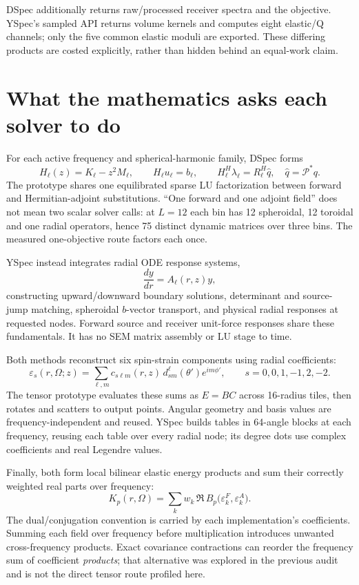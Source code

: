 DSpec additionally returns raw/processed receiver spectra and the objective. YSpec's sampled API returns volume kernels and computes eight elastic/Q channels; only the five common elastic moduli are exported. These differing products are costed explicitly, rather than hidden behind an equal-work claim.

\clearpage\section{What the mathematics asks each solver to do}
For each active frequency and spherical-harmonic family, DSpec forms
\begin{equation}
H_\ell(z)=K_\ell-z^2M_\ell,\qquad
H_\ell u_\ell=b_\ell,\qquad
H_\ell^{H}\lambda_\ell=R_\ell^{H}\widehat q,
\quad \widehat q=\mathcal P^*q.
\end{equation}
The prototype shares one equilibrated sparse LU factorization between forward and Hermitian-adjoint substitutions. ``One forward and one adjoint field'' does not mean two scalar solver calls: at $L=12$ each bin has 12 spheroidal, 12 toroidal and one radial operators, hence 75 distinct dynamic matrices over three bins. The measured one-objective route factors each once.

YSpec instead integrates radial ODE response systems,
\begin{equation}
\frac{dy}{dr}=A_\ell(r,z)y,
\end{equation}
constructing upward/downward boundary solutions, determinant and source-jump matching, spheroidal $b$-vector transport, and physical radial responses at requested nodes. Forward source and receiver unit-force responses share these fundamentals. It has no SEM matrix assembly or LU stage to time.

Both methods reconstruct six spin-strain components using radial coefficients:
\begin{equation}
\varepsilon_s(r,\Omega;z)=
\sum_{\ell,m} c_{s\ell m}(r,z)\,
 d^\ell_{s m}(\theta')e^{im\phi'},\qquad s=0,0,1,-1,2,-2.
\end{equation}
The tensor prototype evaluates these sums as $E=BC$ across 16-radius tiles, then rotates and scatters to output points. Angular geometry and basis values are frequency-independent and reused. YSpec builds tables in 64-angle blocks at each frequency, reusing each table over every radial node; its degree dots use complex coefficients and real Legendre values.

Finally, both form local bilinear elastic energy products and sum their correctly weighted real parts over frequency:
\begin{equation}
K_p(r,\Omega)=\sum_k w_k\,\Re\,B_p
\bigl(\varepsilon^F_k,\varepsilon^A_k\bigr).
\end{equation}
The dual/conjugation convention is carried by each implementation's coefficients. Summing each field over frequency before multiplication introduces unwanted cross-frequency products. Exact covariance contractions can reorder the frequency sum of coefficient \emph{products}; that alternative was explored in the previous audit and is not the direct tensor route profiled here.

